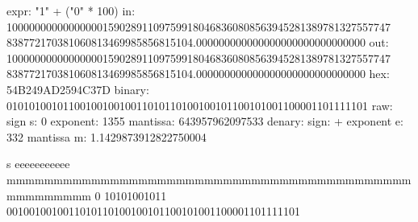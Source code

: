     expr:   "1" + ("0" * 100)
    in:     10000000000000000159028911097599180468360808563945281389781327557747
838772170381060813469985856815104.000000000000000000000000000000
    out:    10000000000000000159028911097599180468360808563945281389781327557747
838772170381060813469985856815104.000000000000000000000000000000
    hex:    54B249AD2594C37D
    binary: 0101010010110010010010011010110100100101100101001100001101111101
    raw:    sign s: 0  exponent:   1355  mantissa:         643957962097533
    denary: sign:   +  exponent e:  332  mantissa m: 1.1429873912822750004

    s eeeeeeeeeee mmmmmmmmmmmmmmmmmmmmmmmmmmmmmmmmmmmmmmmmmmmmmmmmmmmm
    0 10101001011 0010010010011010110100100101100101001100001101111101

